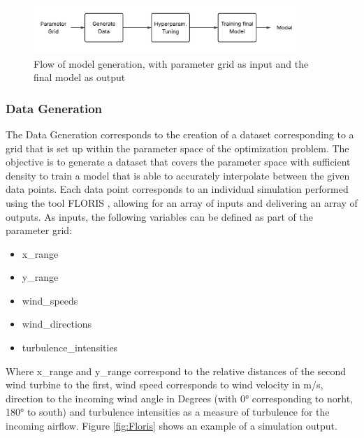 \documentclass[preprint,12pt]{elsarticle}
\begin{document}
\begin{figure}[h] 
	\centering
	\includegraphics[width=0.9\textwidth]{../figures/modelling/model_flow.png} 
	\caption{Flow of model generation, with parameter grid as input and the final model as output}
	\label{fig:model_flow}
\end{figure}

\subsubsection{Data Generation}

The Data Generation corresponds to the creation of a dataset corresponding to a grid that is set up within the parameter space of the optimization problem. The objective is to generate a dataset that covers the parameter space with sufficient density to train a model that is able to accurately interpolate between the given data points. Each data point corresponds to an individual simulation performed using the tool FLORIS \cite{nrel_floris_web}, allowing for an array of inputs and delivering an array of outputs. As inputs, the following variables can be defined as part of the parameter grid:

\begin{itemize}
	\item x\_range
	\item y\_range
	\item wind\_speeds
	\item wind\_directions
	\item turbulence\_intensities
\end{itemize}

Where x\_range and y\_range correspond to the relative distances of the second wind turbine to the first, wind speed corresponds to wind velocity in m/s,  direction to the incoming wind angle in Degrees (with 0° corresponding to norht, 180° to south) and turbulence intensities as a measure of turbulence for the incoming airflow. Figure \ref{fig:Floris} shows an example of a simulation output. 
\end{document}
